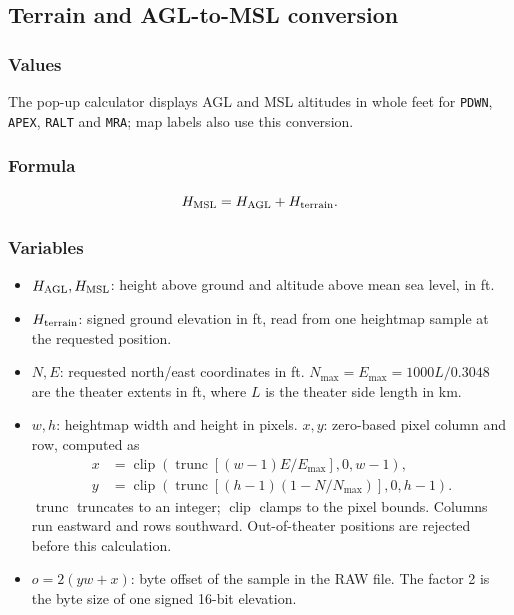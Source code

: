 \documentclass[10pt,a4paper]{amsart}
\DeclareMathOperator{\clip}{clip}
\DeclareMathOperator{\trunc}{trunc}
\begin{document}
\subsection{Terrain and AGL-to-MSL conversion}\label{subsec:terrain}
\subsubsection*{Values}
The pop-up calculator displays AGL and MSL altitudes in whole feet
for \texttt{PDWN}, \texttt{APEX}, \texttt{RALT} and \texttt{MRA};
map labels also use this conversion.

\subsubsection*{Formula}
\[
 H_{\rm MSL}=H_{\rm AGL}+H_{\rm terrain}.
\]

\subsubsection*{Variables}
\begin{itemize}
\setlength{\itemsep}{0pt}
\setlength{\parsep}{0pt}
\item $H_{\rm AGL},H_{\rm MSL}$: height above ground and altitude
above mean sea level, in ft.
\item $H_{\rm terrain}$: signed ground elevation in ft, read from
one heightmap sample at the requested position.
\item $N,E$: requested north/east coordinates in ft.
$N_{\max}=E_{\max}=1000L/0.3048$ are the theater extents in ft,
where $L$ is the theater side length in km.
\item $w,h$: heightmap width and height in pixels.
$x,y$: zero-based pixel column and row, computed as
\begin{align*}
 x&=\clip\!\left(\trunc\!\left[(w-1)E/E_{\max}\right],0,w-1\right),\\
 y&=\clip\!\left(\trunc\!\left[(h-1)(1-N/N_{\max})\right],0,h-1\right).
\end{align*}
$\trunc$ truncates to an integer; $\clip$ clamps to the pixel bounds.
Columns run eastward and rows southward. Out-of-theater positions
are rejected before this calculation.
\item $o=2(yw+x)$: byte offset of the sample in the RAW file.
The factor 2 is the byte size of one signed 16-bit elevation.
\end{itemize}
\end{document}
